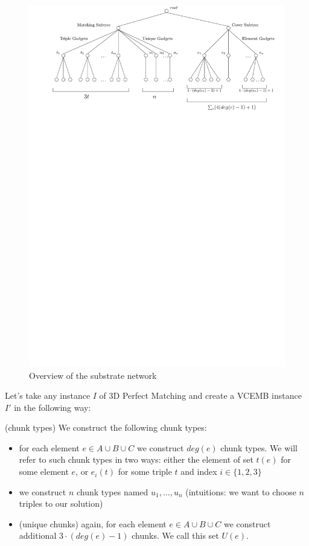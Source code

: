 \begin{figure}[t]
\centering
\includegraphics[width=0.99\columnwidth]{reduction/overview.pdf}
\vspace{-1em}
\caption{Overview of the substrate network}
\vspace{-1em}
\end{figure}


Let's take any instance $I$ of 3D Perfect Matching and create a VCEMB
instance $I'$ in the following way:

(chunk types) We construct the following chunk types:
\begin{itemize}
\item for each element $e\in A\cup B\cup C$ we construct $deg(e)$
  chunk types. We will refer to such chunk types in two ways: either
  the element of set $t(e)$ for some element $e$, or $e_i(t)$ for some
  triple $t$ and index $i \in \{1,2,3\}$
\item we construct $n$ chunk types named $u_1, \ldots, u_n$ (intuitions: we want to choose $n$ triples to our solution)
\item (unique chunks) again, for each element $e\in A\cup B\cup C$ we construct additional $3\cdot(deg(e) - 1)$ chunks. We call this set $U(e)$.
\end{itemize}

